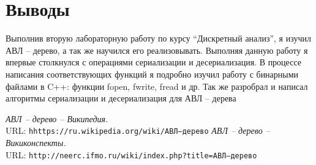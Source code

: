 \documentclass[pdf, unicode, 12pt, a4paper,oneside,fleqn]{article}
\begin{document}
\section{Выводы}
Выполнив вторую лабораторную работу по курсу \enquote{Дискретный анализ}, я изучил АВЛ -- дерево, а так же научился его реализовывать. Выполняя данную работу я впервые столкнулся с операциями сериализации и десериализация. В процессе написания соответствующих функций я подробно изучил работу с бинарными файлами в C++: функции fopen, fwrite, fread и др. Так же разробрал и написал алгоритмы сериализации и десериализация для АВЛ -- дерева\pagebreak
\begin{thebibliography}{99}
{\itshape АВЛ -- дерево -- Википедия.} \\URL: \texttt{hhttps://ru.wikipedia.org/wiki/АВЛ--дерево} 
{\itshape АВЛ -- дерево -- Викиконспекты.} \\URL: \texttt{http://neerc.ifmo.ru/wiki/index.php?title=АВЛ--дерево} 
\end{thebibliography}
\pagebreak
\end{document}
